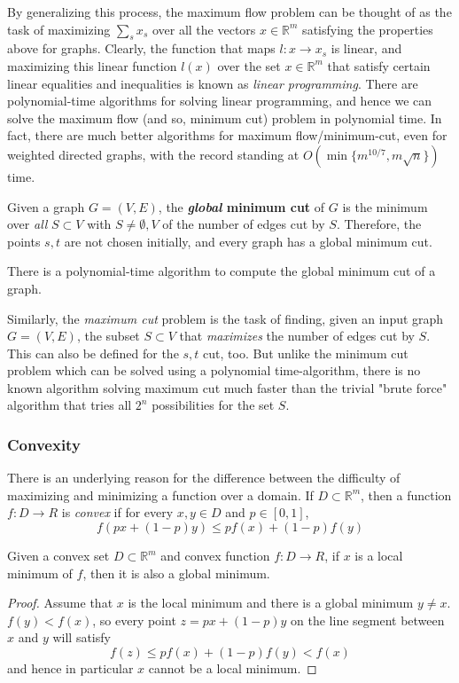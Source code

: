 \documentclass{article}
\begin{document}
  By generalizing this process, the maximum flow problem can be thought of as the task of maximizing $\sum_s x_s$ over all the vectors $x \in \mathbb{R}^m$ satisfying the properties above for graphs. Clearly, the function that maps $l: x \rightarrow x_s$ is linear, and maximizing this linear function $l(x)$ over the set $x \in \mathbb{R}^m$ that satisfy certain linear equalities and inequalities is known as \textit{linear programming}. There are polynomial-time algorithms for solving linear programming, and hence we can solve the maximum flow (and so, minimum cut) problem in polynomial time. In fact, there are much better algorithms for maximum flow/minimum-cut, even for weighted directed graphs, with the record standing at $O(\min\{m^{10/7}, m\sqrt{n}\})$ time. 

  \begin{definition}
  Given a graph $G = (V, E)$, the \textbf{\textit{global} minimum cut} of $G$ is the minimum over \textit{all} $S \subset V$ with $S \neq \emptyset, V$ of the number of edges cut by $S$. Therefore, the points $s, t$ are not chosen initially, and every graph has a global minimum cut. 
  \end{definition}

  \begin{theorem}
  There is a polynomial-time algorithm to compute the global minimum cut of a graph. 
  \end{theorem}

  Similarly, the \textit{maximum cut} problem is the task of finding, given an input graph $G = (V, E)$, the subset $S \subset V$ that \textit{maximizes} the number of edges cut by $S$. This can also be defined for the $s, t$ cut, too. But unlike the minimum cut problem which can be solved using a polynomial time-algorithm, there is no known algorithm solving maximum cut much faster than the trivial "brute force" algorithm that tries all $2^n$ possibilities for the set $S$. 

  \subsubsection{Convexity}
  There is an underlying reason for the difference between the difficulty of maximizing and minimizing a function over a domain. If $D \subset \mathbb{R}^m$, then a function $f: D \longrightarrow R$ is \textit{convex} if for every $x, y \in D$ and $p \in [0,1]$, 
  \[f(px + (1-p)y) \leq p f(x) + (1-p) f(y)\]

  \begin{theorem}
  Given a convex set $D \subset \mathbb{R}^m$ and convex function $f: D \longrightarrow R$, if $x$ is a local minimum of $f$, then it is also a global minimum. 
  \end{theorem}
  \begin{proof}
  Assume that $x$ is the local minimum and there is a global minimum $y \neq x$. $f(y) < f(x)$, so every point $z = px + (1-p) y$ on the line segment between $x$ and $y$ will satisfy 
  \[f(z) \leq p f(x) + (1-p) f(y) < f(x)\]
  and hence in particular $x$ cannot be a local minimum. 
  \end{proof}
\end{document}

